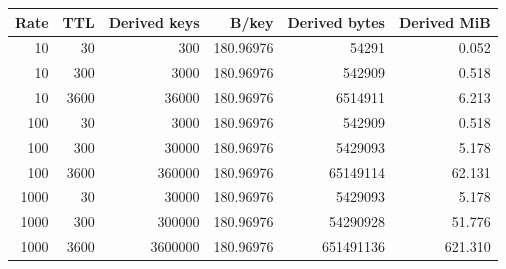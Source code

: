 \begin{tabular}{rrrrrr}\toprule
Rate & TTL & Derived keys & B/key & Derived bytes & Derived MiB \\
\midrule
10 & 30 & 300 & 180.96976 & 54291 & 0.052 \\
10 & 300 & 3000 & 180.96976 & 542909 & 0.518 \\
10 & 3600 & 36000 & 180.96976 & 6514911 & 6.213 \\
100 & 30 & 3000 & 180.96976 & 542909 & 0.518 \\
100 & 300 & 30000 & 180.96976 & 5429093 & 5.178 \\
100 & 3600 & 360000 & 180.96976 & 65149114 & 62.131 \\
1000 & 30 & 30000 & 180.96976 & 5429093 & 5.178 \\
1000 & 300 & 300000 & 180.96976 & 54290928 & 51.776 \\
1000 & 3600 & 3600000 & 180.96976 & 651491136 & 621.310 \\
\bottomrule\end{tabular}
